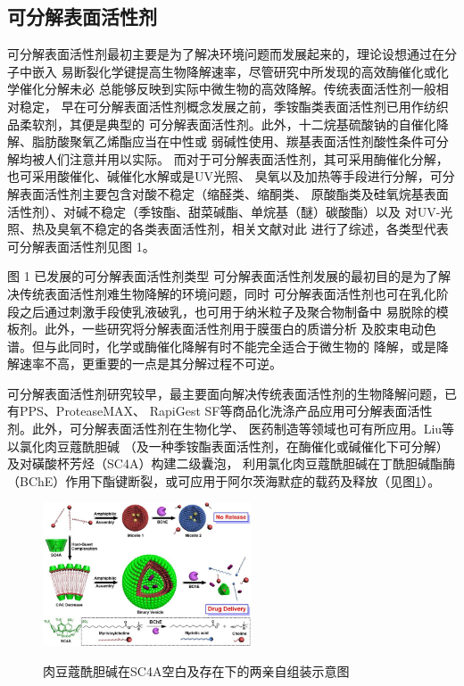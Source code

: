 \documentclass[bachelor,winfonts]{jnuthesis} %
\begin{document}
    \subsection{可分解表面活性剂}
    可分解表面活性剂最初主要是为了解决环境问题而发展起来的，理论设想通过在分子中嵌入
    易断裂化学键提高生物降解速率，尽管研究中所发现的高效酶催化或化学催化分解未必
    总能够反映到实际中微生物的高效降解\cite{tehrani2007}。传统表面活性剂一般相对稳定，
    早在可分解表面活性剂概念发展之前，季铵酯类表面活性剂已用作纺织品柔软剂，其便是典型的
    可分解表面活性剂。此外，十二烷基硫酸钠的自催化降解、脂肪酸聚氧乙烯酯应当在中性或
    弱碱性使用、羰基表面活性剂酸性条件可分解均被人们注意并用以实际\cite{tehrani2007}。
    而对于可分解表面活性剂，其可采用酶催化分解，也可采用酸催化、碱催化水解或是UV光照、
    臭氧以及加热等手段进行分解，可分解表面活性剂主要包含对酸不稳定（缩醛类、缩酮类、
    原酸酯类及硅氧烷基表面活性剂）、对碱不稳定（季铵酯、甜菜碱酯、单烷基（醚）碳酸酯）以及
    对UV-光照、热及臭氧不稳定的各类表面活性剂，相关文献\cite{hellberg2000,tehrani2007,shukla2010,narayanan2008}对此
    进行了综述，各类型代表可分解表面活性剂见图 1。
    
   
    
    图 1 已发展的可分解表面活性剂类型
    可分解表面活性剂发展的最初目的是为了解决传统表面活性剂难生物降解的环境问题，同时
    可分解表面活性剂也可在乳化阶段之后通过刺激手段使乳液破乳，也可用于纳米粒子及聚合物制备中
    易脱除的模板剂\cite{liu2007}。此外，一些研究将分解表面活性剂用于膜蛋白的质谱分析\cite{norris2003}
    及胶束电动色谱\cite{stanley2012}。但与此同时，化学或酶催化降解有时不能完全适合于微生物的
    降解\cite{tehrani2007}，或是降解速率不高，更重要的一点是其分解过程不可逆\cite{liu2007}。
    
    可分解表面活性剂研究较早，最主要面向解决传统表面活性剂的生物降解问题，已有PPS、ProteaseMAX、
    RapiGest SF等商品化洗涤产品应用可分解表面活性剂。此外，可分解表面活性剂在生物化学、
    医药制造等领域也可有所应用\cite{hellberg2000}。Liu等\cite{guo2012}以氯化肉豆蔻酰胆碱
    （及一种季铵酯表面活性剂，在酶催化或碱催化下可分解）及对磺酸杯芳烃（SC4A）构建二级囊泡，
    利用氯化肉豆蔻酰胆碱在丁酰胆碱酯酶（BChE）作用下酯键断裂，或可应用于阿尔茨海默症的载药及释放（见图\ref{fig:Ch1-SC4A}）。
    
    \begin{figure}[htbp]
        \centering
        \includegraphics[width= 0.55\textwidth]{Figure/Ch1-SC4A}\\
        \caption{肉豆蔻酰胆碱在SC4A空白及存在下的两亲自组装示意图}\label{fig:Ch1-SC4A}
    \end{figure}
        
\end{document}
